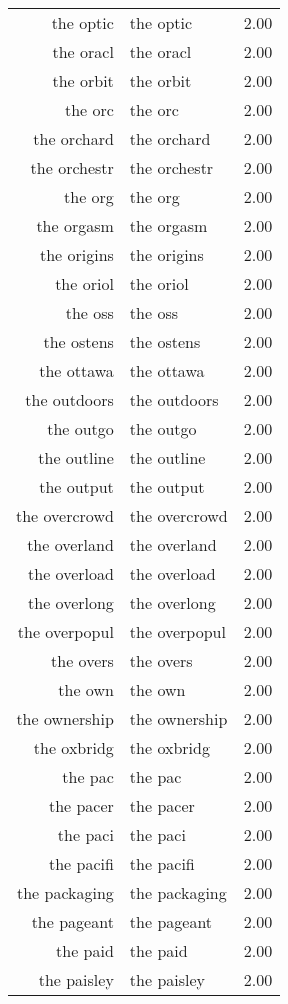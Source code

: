 \begin{table}[ht]
\begin{tabular}{rlr}
  the optic & the optic & 2.00 \\ 
  the oracl & the oracl & 2.00 \\ 
  the orbit & the orbit & 2.00 \\ 
  the orc & the orc & 2.00 \\ 
  the orchard & the orchard & 2.00 \\ 
  the orchestr & the orchestr & 2.00 \\ 
  the org & the org & 2.00 \\ 
  the orgasm & the orgasm & 2.00 \\ 
  the origins & the origins & 2.00 \\ 
  the oriol & the oriol & 2.00 \\ 
  the oss & the oss & 2.00 \\ 
  the ostens & the ostens & 2.00 \\ 
  the ottawa & the ottawa & 2.00 \\ 
  the outdoors & the outdoors & 2.00 \\ 
  the outgo & the outgo & 2.00 \\ 
  the outline & the outline & 2.00 \\ 
  the output & the output & 2.00 \\ 
  the overcrowd & the overcrowd & 2.00 \\ 
  the overland & the overland & 2.00 \\ 
  the overload & the overload & 2.00 \\ 
  the overlong & the overlong & 2.00 \\ 
  the overpopul & the overpopul & 2.00 \\ 
  the overs & the overs & 2.00 \\ 
  the own & the own & 2.00 \\ 
  the ownership & the ownership & 2.00 \\ 
  the oxbridg & the oxbridg & 2.00 \\ 
  the pac & the pac & 2.00 \\ 
  the pacer & the pacer & 2.00 \\ 
  the paci & the paci & 2.00 \\ 
  the pacifi & the pacifi & 2.00 \\ 
  the packaging & the packaging & 2.00 \\ 
  the pageant & the pageant & 2.00 \\ 
  the paid & the paid & 2.00 \\ 
  the paisley & the paisley & 2.00 \\ 

\end{tabular}
\end{table}
